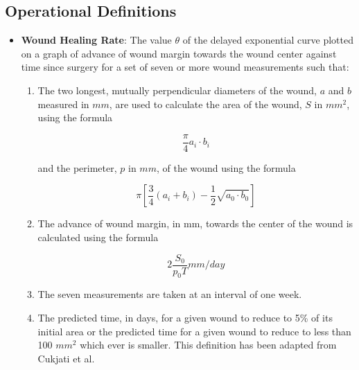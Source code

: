 \documentclass{article}
\begin{document}
\subsection{Operational Definitions}
\begin{itemize}
\item \textbf{Wound Healing Rate}: The value $\theta$ of the delayed exponential curve
plotted on a graph of advance of wound margin towards the wound center against
time since surgery for a set of seven or more wound measurements such that:
\begin{enumerate}
\item The two longest, mutually perpendicular diameters of the wound, $a$ and $b$
measured in $mm$, are used to calculate the area of the wound, $S$ in $mm^2$,
using the formula

\[\frac{\pi}{4}a_i\cdot b_i\]

and the perimeter, $p$ in $mm$, of the wound using the formula

\[\pi[\frac{3}{4}(a_i+b_i)-\frac{1}{2}\sqrt{a_0\cdot b_0}]\]

\item The advance of wound margin, in mm, towards the center of the wound is
calculated using the formula

\[2\frac{S_0}{p_0T} mm/day\]

\item The seven measurements are taken at an interval of one week.\cite{Cukjati_2001}

\item The predicted time, in days, for a given wound to reduce to 5\% of its
initial area or the predicted time for a given wound to reduce to less than
100 $mm^2$ which ever is smaller. This definition has been adapted from
Cukjati et al.\cite{Cukjati_2001}
\end{enumerate}


\end{itemize}
\end{document}
